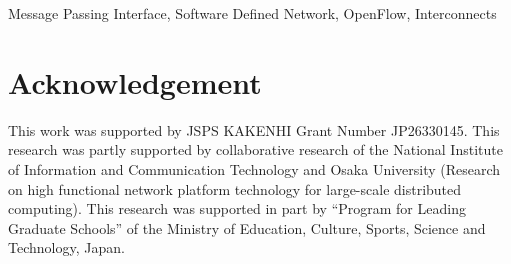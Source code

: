 \documentclass[conference]{IEEEtran}
\begin{document}
\begin{IEEEkeywords}
    Message Passing Interface, Software Defined Network, OpenFlow, Interconnects
\end{IEEEkeywords}








\section*{Acknowledgement}
This work was supported by JSPS KAKENHI Grant Number JP26330145. This research
was partly supported by collaborative research of the National Institute of
Information and Communication Technology and Osaka University (Research on
high functional network platform technology for large-scale distributed
computing). This research was supported in part by ``Program for Leading
Graduate Schools'' of the Ministry of Education, Culture, Sports, Science and
Technology, Japan.

\printbibliography[heading=bibintoc,title={References}]

\par\leavevmode
\end{document}
